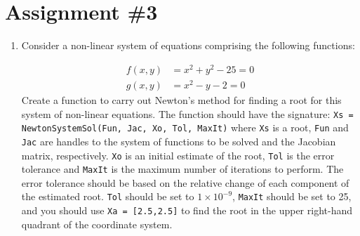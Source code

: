\chapter{Assignment \#3}
\label{ch:ass3n}

\begin{fullwidth}






\begin{enumerate}

\item Consider a non-linear system of equations comprising the following functions:


\begin{align*}
f(x,y) &= x^2 + y^2 - 25 = 0 \\
g(x,y) &= x^2 - y - 2 = 0
\end{align*}
Create a function to carry out Newton's method for finding a root for this system of non-linear equations.  The function should have the signature: \lstinline[style=myMatlab]{Xs = NewtonSystemSol(Fun, Jac, Xo, Tol, MaxIt)} where \lstinline[style=myMatlab]{Xs} is a root, \lstinline[style=myMatlab]{Fun} and \lstinline[style=myMatlab]{Jac} are handles to the system of functions to be solved and the Jacobian matrix, respectively.  \lstinline[style=myMatlab]{Xo} is an initial estimate of the root, \lstinline[style=myMatlab]{Tol} is the error tolerance and \lstinline[style=myMatlab]{MaxIt} is the maximum number of iterations to perform.  The error tolerance should be based on the relative change of each component of the estimated root. \lstinline[style=myMatlab]{Tol} should be set to $1 \times 10^{-9}$, \lstinline[style=myMatlab]{MaxIt} should be set to 25, and you should use \lstinline[style=myMatlab]{Xa = [2.5,2.5]} to find the root in the upper right-hand quadrant of the coordinate system.




\end{enumerate}
\end{fullwidth}
